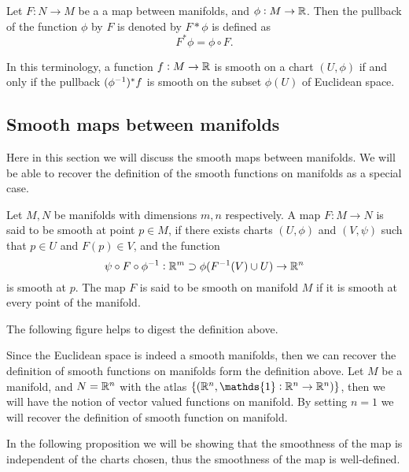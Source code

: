 \begin{definition}
	Let $ F: N\to M $ be a a map between manifolds, and $ \phi: M \to \mathbb{R} $. Then the pullback of the function $ \phi $ by $ F $ is denoted by $ F*\phi $ is defined as 
	\[ F^* \phi = \phi\circ F. \]
\end{definition}

\begin{remark}
	In this terminology, a function $ f:M \to \mathbb{R} $ is smooth on a chart $ (U,\phi) $ if and only if the pullback $ (\phi^{-1})^* f$ is smooth on the subset $ \phi(U) $ of Euclidean space.
\end{remark}

\subsection{Smooth maps between manifolds}
Here in this section we will discuss the smooth maps between manifolds. We will be able to recover the definition of the smooth functions on manifolds as a special case. 

\begin{definition}
	\label{def:SmoothMapsBetweenManifolds}
	Let $ M, N $ be manifolds with dimensions $ m,n $ respectively. A map $ F: M \to N $ is said to be smooth at point $ p \in M $, if there exists charts $ (U,\phi) $ and $ (V,\psi) $ such that $ p \in U $ and $ F(p) \in V $, and the function 
	\[ \psi\circ F \circ \phi^{-1}: \mathbb{R}^m \supset \phi(F^{-1}(V) \cup U) \to \mathbb{R}^n  \]
	is smooth at $ p $. The map $ F $ is said to be smooth on manifold $ M $ if it is smooth at every point of the manifold.
\end{definition}
\begin{remark}
	The following figure helps to digest the definition above.
	
\end{remark}

\begin{remark}
	Since the Euclidean space is indeed a smooth manifolds, then we can recover the definition of smooth functions on manifolds form the definition above. Let $ M $ be a manifold, and $ N = \mathbb{R}^n $ with the atlas $ \set{(\R^n, \mathds{1}: \R^n \to \R^n)} $, then we will have the notion of vector valued functions on manifold. By setting $ n=1 $ we will recover the definition of smooth function on manifold.
\end{remark}

In the following proposition we will be showing that the smoothness of the map is independent of the charts chosen, thus the smoothness of the map is well-defined.

